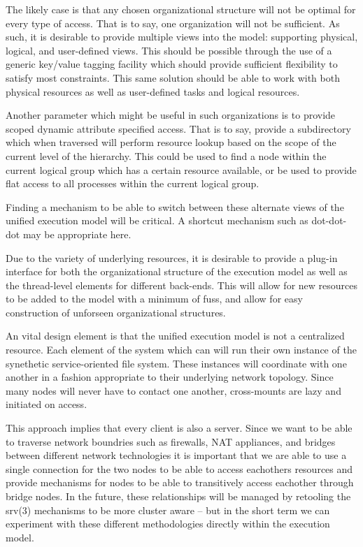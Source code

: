\documentclass{sig-alternate}
\begin{document}
The likely case is that any chosen organizational structure will not be
optimal for every type of access.   That is to say, one organization will
not be sufficient.  As such, it is desirable to provide multiple views into
the model: supporting physical, logical, and user-defined views.  This should
be possible through the use of a generic key/value tagging facility which
should provide sufficient flexibility to satisfy most constraints.
This same solution should be able to work with both physical resources
as well as user-defined tasks and logical resources.

Another parameter which might be useful in such organizations is to
provide scoped dynamic attribute specified access.  That is to say, provide
a subdirectory which when traversed will perform resource lookup based
on the scope of the current level of the hierarchy.  This could be used
to find a node within the current logical group which has a certain
resource available, or be used to provide flat access to all processes
within the current logical group.

Finding a mechanism to be able to switch between these alternate views
of the unified execution model will be critical.  A shortcut mechanism
such as dot-dot-dot may be appropriate here.

Due to the variety of underlying resources, it is desirable to 
provide a plug-in interface for both the organizational structure of
the execution model as well as the thread-level elements for different
back-ends.  This will allow for new resources to be added to the model
with a minimum of fuss, and allow for easy construction of unforseen
organizational structures.

An vital design element is that the unified execution model is not
a centralized resource.  Each element of the system which can will run
their own instance of the synethetic service-oriented file system.  These
instances will coordinate with one another in a fashion appropriate to
their underlying network topology.  Since many nodes will never have
to contact one another, cross-mounts are lazy and initiated on access.

This approach implies that every client is also a server.  Since we 
want to be able to traverse network boundries such as firewalls, NAT
appliances, and bridges between different network technologies it is
important that we are able to use a single connection for the two nodes
to be able to access eachothers resources and provide mechanisms for
nodes to be able to transitively access eachother through bridge nodes.
In the future, these relationships will be managed by retooling the
srv(3) mechanisms to be more cluster aware -- but in the short term we
can experiment with these different methodologies directly within the
execution model.
\end{document}
